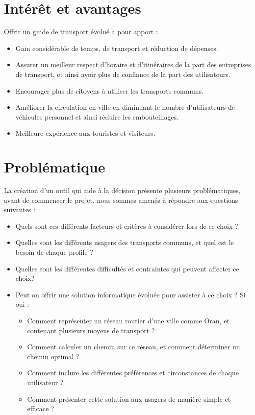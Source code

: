 	\section{Intérêt et avantages}
		Offrir un guide de transport évolué a pour apport :
		\begin{itemize}
		\item Gain considérable de temps, de transport et réduction de dépenses.
		\item Assurer un meilleur respect d'horaire et d'itinéraires de la part des entreprises de transport, et ainsi avoir plus de confiance de la part des utilisateurs.
		\item Encourager plus de citoyens à utiliser les transports communs.
		\item Améliorer la circulation en ville en diminuant le nombre d'utilisateurs de véhicules personnel et ainsi réduire les embouteillages.
		\item Meilleure expérience aux touristes et visiteurs.
		\end{itemize}

	\section{Problématique}

	La création d'un outil qui aide à la décision présente plusieurs problématiques, avant de commencer le projet, nous sommes amenés à répondre aux questions suivantes :
		\begin{itemize}
		\item Quels sont ces différents facteurs et critères à considérer lors de ce choix ?
		\item Quelles sont les différents usagers des transports communs, et quel est le besoin de chaque profile ?
		\item Quelles sont les différentes difficultés et contraintes qui peuvent affecter ce choix?
		\item Peut on offrir une solution informatique évoluée pour assister à ce choix ? Si oui : 
			\begin{itemize}
			\item Comment représenter un réseau routier d'une ville comme Oran, et contenant plusieurs moyens de transport ?
			\item Comment calculer un chemin sur ce réseau, et comment déterminer un chemin optimal ?
			\item Comment inclure les différentes préférences et circonstances de chaque utilisateur ?
			\item Comment présenter cette solution aux usagers de manière simple et efficace ?
			\end{itemize}
		\end{itemize}
			
